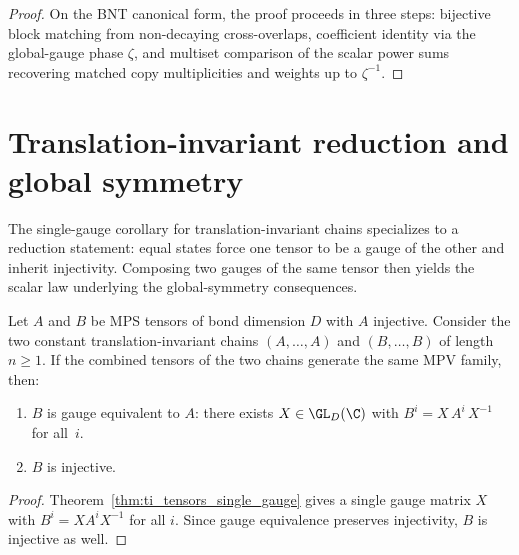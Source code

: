 \begin{proof}
    \leanok
    On the BNT canonical form, the proof proceeds in three steps:
    bijective block matching from non-decaying cross-overlaps, coefficient
    identity via the global-gauge phase $\zeta$, and multiset comparison of
    the scalar power sums recovering matched copy multiplicities and
    weights up to $\zeta^{-1}$.
\end{proof}

\section{Translation-invariant reduction and global symmetry}%
\label{sec:ti_reduction}

The single-gauge corollary for translation-invariant chains specializes to
a reduction statement: equal states force one tensor to be a gauge of the
other and inherit injectivity. Composing two gauges of the same tensor then
yields the scalar law underlying the global-symmetry consequences.

\begin{theorem}%
    \label{thm:ti_reduction_corollary}
    \leanok
    Let $A$ and $B$ be MPS tensors of bond dimension $D$ with $A$
    injective.
    Consider the two constant translation-invariant chains
    $(A, \ldots, A)$ and $(B, \ldots, B)$ of length $n \ge 1$.
    If the combined tensors of the two chains generate the same MPV
    family, then:
    \begin{enumerate}
        \item $B$ is gauge equivalent to $A$: there exists
              $X \in \GL_D(\C)$ with $B^i = X\, A^i\, X^{-1}$ for
              all~$i$.
        \item $B$ is injective.
    \end{enumerate}
\end{theorem}

\begin{proof}\leanok{}
    Theorem~\ref{thm:ti_tensors_single_gauge} gives a single gauge matrix
    $X$ with $B^i = X A^i X^{-1}$ for all $i$.
    Since gauge equivalence preserves injectivity, $B$ is injective as well.
\end{proof}

